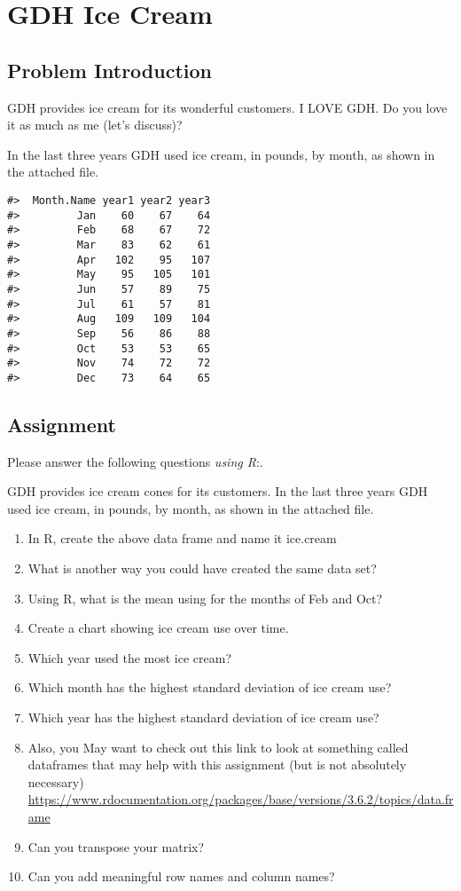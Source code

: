 \documentclass[
]{book}
\providecommand{\tightlist}{%
  \setlength{\itemsep}{0pt}\setlength{\parskip}{0pt}}
\begin{document}
\hypertarget{gdh-ice-cream}{%
\chapter{GDH Ice Cream}\label{gdh-ice-cream}}

\hypertarget{problem-introduction}{%
\section{Problem Introduction}\label{problem-introduction}}

GDH provides ice cream for its wonderful customers. I LOVE GDH. Do you love it as much as me (let's discuss)?

In the last three years GDH used ice cream, in pounds, by month, as shown in the attached file.

\begin{verbatim}
#>  Month.Name year1 year2 year3
#>         Jan    60    67    64
#>         Feb    68    67    72
#>         Mar    83    62    61
#>         Apr   102    95   107
#>         May    95   105   101
#>         Jun    57    89    75
#>         Jul    61    57    81
#>         Aug   109   109   104
#>         Sep    56    86    88
#>         Oct    53    53    65
#>         Nov    74    72    72
#>         Dec    73    64    65
\end{verbatim}

\hypertarget{assignment}{%
\section{Assignment}\label{assignment}}

Please answer the following questions \emph{using R}:.

GDH provides ice cream cones for its customers. In the last three years GDH used ice cream, in pounds, by month, as shown in the attached file.

\begin{enumerate}
\def\labelenumi{\arabic{enumi}.}
\tightlist
\item
  In R, create the above data frame and name it ice.cream
\item
  What is another way you could have created the same data set?
\item
  Using R, what is the mean using for the months of Feb and Oct?
\item
  Create a chart showing ice cream use over time.
\item
  Which year used the most ice cream?
\item
  Which month has the highest standard deviation of ice cream use?
\item
  Which year has the highest standard deviation of ice cream use?
\item
  Also, you May want to check out this link to look at something called dataframes that may help with this assignment (but is not absolutely necessary) \url{https://www.rdocumentation.org/packages/base/versions/3.6.2/topics/data.frame}
\item
  Can you transpose your matrix?
\item
  Can you add meaningful row names and column names?
\end{enumerate}
\end{document}
